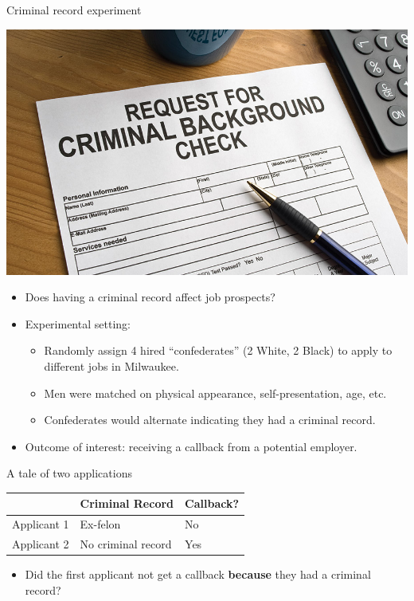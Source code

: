\documentclass[
  ignorenonframetext,
]{beamer}
\providecommand{\tightlist}{%
  \setlength{\itemsep}{0pt}\setlength{\parskip}{0pt}}
\begin{document}
\begin{frame}{Criminal record experiment}
\label{criminal-record-experiment}
\begin{center}
\includegraphics[width=.4\textwidth]{figs/criminal_record.jpg}
\end{center} \pause

\begin{itemize}
\tightlist
\item
  Does having a criminal record affect job prospects? \pause 
\item
  Experimental setting:\pause 

  \begin{itemize}
  \tightlist
  \item
    Randomly assign 4 hired ``confederates'' (2 White, 2 Black) to apply
    to different jobs in Milwaukee.\pause 
  \item
    Men were matched on physical appearance, self-presentation, age,
    etc.\pause 
  \item
    Confederates would alternate indicating they had a criminal
    record.\pause 
  \end{itemize}
\item
  Outcome of interest: receiving a callback from a potential employer.
\end{itemize}
\end{frame}

\begin{frame}{A tale of two applications}
\label{a-tale-of-two-applications}
\begin{center}
\begin{tabular}{ l | l  l }
     & Criminal Record  & Callback? \\ \hline
    Applicant 1 & Ex-felon & No \\ 
    Applicant 2 & No criminal record & Yes \\ 
\end{tabular}
\end{center}

\pause

\begin{itemize}
\tightlist
\item
  Did the first applicant not get a callback \textbf{because} they had a
  criminal record?
\end{itemize}
\end{frame}
\end{document}
